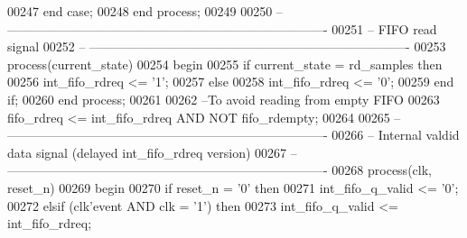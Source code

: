 \begin{DoxyCode}
00247    \textcolor{keywordflow}{end} \textcolor{keywordflow}{case};
00248 \textcolor{keywordflow}{end} \textcolor{keywordflow}{process};
00249 
00250 \textcolor{keyword}{-- ----------------------------------------------------------------------------}
00251 \textcolor{keyword}{-- FIFO read signal}
00252 \textcolor{keyword}{-- ----------------------------------------------------------------------------}
00253 \textcolor{keywordflow}{process}(current_state)
00254 \textcolor{vhdlkeyword}{begin}
00255    \textcolor{keywordflow}{if} \textcolor{vhdlchar}{current_state} \textcolor{vhdlchar}{=} \textcolor{vhdlchar}{rd\_samples} \textcolor{keywordflow}{then} 
00256       \textcolor{vhdlchar}{int_fifo_rdreq} \textcolor{vhdlchar}{<=} \textcolor{vhdlchar}{'}\textcolor{vhdllogic}{}\textcolor{vhdllogic}{1}\textcolor{vhdlchar}{'};
00257    \textcolor{keywordflow}{else} 
00258       \textcolor{vhdlchar}{int_fifo_rdreq} \textcolor{vhdlchar}{<=} \textcolor{vhdlchar}{'}\textcolor{vhdllogic}{}\textcolor{vhdllogic}{0}\textcolor{vhdlchar}{'};
00259    \textcolor{keywordflow}{end} \textcolor{keywordflow}{if};
00260 \textcolor{keywordflow}{end} \textcolor{keywordflow}{process};
00261 
00262 \textcolor{keyword}{--To avoid reading from empty FIFO}
00263 \textcolor{vhdlchar}{fifo_rdreq} \textcolor{vhdlchar}{<=} \textcolor{vhdlchar}{int_fifo_rdreq} \textcolor{keywordflow}{AND} \textcolor{keywordflow}{NOT} \textcolor{vhdlchar}{fifo_rdempty};
00264 
00265 \textcolor{keyword}{-- ----------------------------------------------------------------------------}
00266 \textcolor{keyword}{-- Internal valdid data signal (delayed int\_fifo\_rdreq version)}
00267 \textcolor{keyword}{-- ----------------------------------------------------------------------------}
00268 \textcolor{keywordflow}{process}(clk, reset_n)
00269 \textcolor{vhdlkeyword}{ begin}
00270    \textcolor{keywordflow}{if} \textcolor{vhdlchar}{reset_n} \textcolor{vhdlchar}{=} \textcolor{vhdlchar}{'}\textcolor{vhdllogic}{}\textcolor{vhdllogic}{0}\textcolor{vhdlchar}{'} \textcolor{keywordflow}{then}
00271       \textcolor{vhdlchar}{int_fifo_q_valid}  \textcolor{vhdlchar}{<=} \textcolor{vhdlchar}{'}\textcolor{vhdllogic}{}\textcolor{vhdllogic}{0}\textcolor{vhdlchar}{'};
00272    \textcolor{keywordflow}{elsif} \textcolor{vhdlchar}{(}\textcolor{vhdlchar}{clk}\textcolor{vhdlchar}{'}\textcolor{vhdlkeyword}{event} \textcolor{keywordflow}{AND} \textcolor{vhdlchar}{clk} \textcolor{vhdlchar}{=} \textcolor{vhdlchar}{'}\textcolor{vhdllogic}{}\textcolor{vhdllogic}{1}\textcolor{vhdlchar}{'}\textcolor{vhdlchar}{)} \textcolor{keywordflow}{then}
00273       \textcolor{vhdlchar}{int_fifo_q_valid} \textcolor{vhdlchar}{<=} \textcolor{vhdlchar}{int_fifo_rdreq};

\end{DoxyCode}
